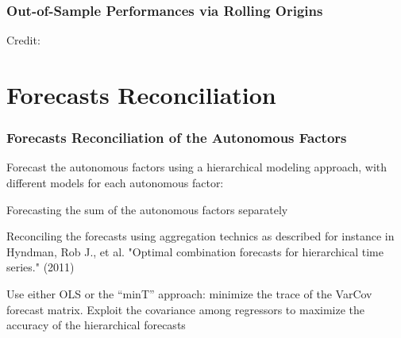 \documentclass{beamer}
\newenvironment{wideitemize}{\itemize\addtolength{\itemsep}{10pt}}{\enditemize}
\begin{document}
 \begin{frame}
 \frametitle{Out-of-Sample Performances via Rolling Origins}
  \hspace*{15pt}\hbox{\scriptsize Credit:}      
 \end{frame}


\section{Forecasts Reconciliation}
\begin{frame}
  \frametitle{Forecasts Reconciliation of the Autonomous Factors}

  Forecast the autonomous factors using a hierarchical modeling approach, with different models for each autonomous factor:\\
  \medskip

  \begin{wideitemize}
  \item Forecasting the sum of the autonomous factors separately\\
  \item Reconciling the forecasts using aggregation technics as described for instance in Hyndman, Rob J., et al. "Optimal combination forecasts for hierarchical time series." (2011)
  
  \item Use either OLS  or the “minT” approach: minimize the trace of the VarCov forecast matrix. Exploit the covariance among regressors to maximize the accuracy of the hierarchical forecasts    
  \end{wideitemize}   
\end{frame}
\end{document}
